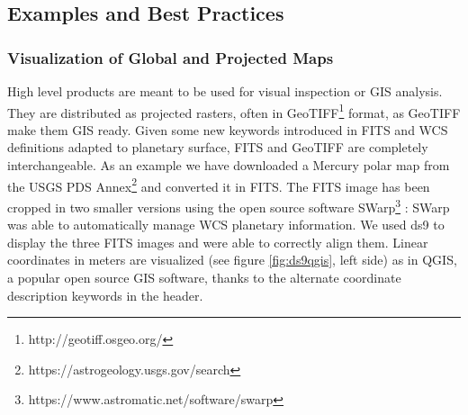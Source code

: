 \subsection{Examples and Best Practices}

\subsubsection{Visualization of Global and Projected Maps}
\label{sssec:maps}
High level products are meant to be used for visual inspection or GIS analysis.
They are distributed as projected rasters, often in
GeoTIFF\footnote{http://geotiff.osgeo.org/}
format, as GeoTIFF make them GIS ready.
Given some new keywords introduced in FITS and WCS definitions adapted to planetary
surface, FITS and GeoTIFF are completely interchangeable.
As an example we have downloaded a Mercury polar map from the USGS
PDS Annex\footnote{https://astrogeology.usgs.gov/search} and converted it in FITS.
The FITS image has been cropped in two smaller versions using the open source software
SWarp\footnote{https://www.astromatic.net/software/swarp} \citep{swarp}: SWarp was able to
automatically manage WCS planetary information.
We used ds9 to display the three FITS images and were able to correctly align them.
Linear coordinates in meters are visualized (see figure \ref{fig:ds9qgis}, left side)
as in QGIS, a popular open source GIS software, thanks to the alternate coordinate
description keywords in the header.
